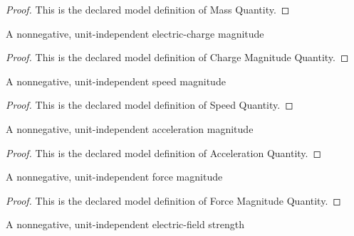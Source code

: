 \begin{proof}
  This is the declared model definition of Mass Quantity.
\end{proof}
\begin{definition}
  \label{def:physics:phyx-mini-0927:phyxminiproblems-problemphyxmini0927-chargemagnitudequantity}
  A nonnegative, unit-independent electric-charge magnitude
\end{definition}
\begin{proof}
  This is the declared model definition of Charge Magnitude Quantity.
\end{proof}
\begin{definition}
  \label{def:physics:phyx-mini-0927:phyxminiproblems-problemphyxmini0927-speedquantity}
  A nonnegative, unit-independent speed magnitude
\end{definition}
\begin{proof}
  This is the declared model definition of Speed Quantity.
\end{proof}
\begin{definition}
  \label{def:physics:phyx-mini-0927:phyxminiproblems-problemphyxmini0927-accelerationquantity}
  A nonnegative, unit-independent acceleration magnitude
\end{definition}
\begin{proof}
  This is the declared model definition of Acceleration Quantity.
\end{proof}
\begin{definition}
  \label{def:physics:phyx-mini-0927:phyxminiproblems-problemphyxmini0927-forcemagnitudequantity}
  A nonnegative, unit-independent force magnitude
\end{definition}
\begin{proof}
  This is the declared model definition of Force Magnitude Quantity.
\end{proof}
\begin{definition}
  \label{def:physics:phyx-mini-0927:phyxminiproblems-problemphyxmini0927-electricfieldstrengthquantity}
  A nonnegative, unit-independent electric-field strength
\end{definition}
